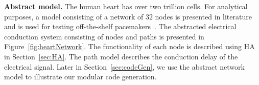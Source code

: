 \noindent \textbf{Abstract model.}
The human heart has over two trillion cells. For analytical purposes, a
model consisting of a network of $32$ nodes is presented in literature
and is used for testing off-the-shelf pacemakers~\cite{chen14,zhihao12}.
The abstracted electrical conduction system consisting  of 
nodes and paths is presented in Figure~\ref{fig:heartNetwork}.
The functionality of each node is described using \acf{HA} in Section~\ref{sec:HA}. The path model describes the 
conduction delay of the electrical signal.
Later in Section~\ref{sec:codeGen}, we use the abstract network model 
to illustrate our modular code generation.

 
